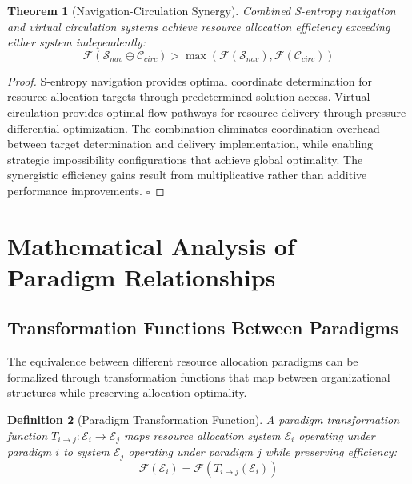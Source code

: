 \documentclass[12pt,a4paper]{article}
\newtheorem{theorem}{Theorem}
\newtheorem{definition}[theorem]{Definition}
\begin{document}
\begin{theorem}[Navigation-Circulation Synergy]
Combined S-entropy navigation and virtual circulation systems achieve resource allocation efficiency exceeding either system independently:
\begin{equation}
\mathcal{F}(\mathcal{S}_{nav} \oplus \mathcal{C}_{circ}) > \max(\mathcal{F}(\mathcal{S}_{nav}), \mathcal{F}(\mathcal{C}_{circ}))
\end{equation}
\end{theorem}

\begin{proof}
S-entropy navigation provides optimal coordinate determination for resource allocation targets through predetermined solution access. Virtual circulation provides optimal flow pathways for resource delivery through pressure differential optimization. The combination eliminates coordination overhead between target determination and delivery implementation, while enabling strategic impossibility configurations that achieve global optimality. The synergistic efficiency gains result from multiplicative rather than additive performance improvements. $\square$
\end{proof}

\section{Mathematical Analysis of Paradigm Relationships}

\subsection{Transformation Functions Between Paradigms}

The equivalence between different resource allocation paradigms can be formalized through transformation functions that map between organizational structures while preserving allocation optimality.

\begin{definition}[Paradigm Transformation Function]
A paradigm transformation function $T_{i \to j} : \mathcal{E}_i \to \mathcal{E}_j$ maps resource allocation system $\mathcal{E}_i$ operating under paradigm $i$ to system $\mathcal{E}_j$ operating under paradigm $j$ while preserving efficiency:
\begin{equation}
\mathcal{F}(\mathcal{E}_i) = \mathcal{F}(T_{i \to j}(\mathcal{E}_i))
\end{equation}
\end{definition}
\end{document}
